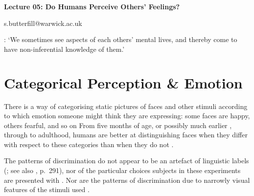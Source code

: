 \documentclass[12pt]{extarticle}
\date{}
\makeatletter
\def \ititle {Origins of Mind}
\def \iemail{s.butterfill@warwick.ac.uk}
\makeatother
\begin{document}
\begin{multicols*}{3}

\setlength\footnotesep{1em}











\def \ititle {Lecture 05: Do Humans Perceive Others’ Feelings?}

\begin{center}

{\Large

\textbf{\ititle}

}



\iemail %

\end{center}

\citet[p.\ 573]{mcneill:2012_embodiment}: ‘We sometimes {see} aspects of each others’ mental lives, and thereby come to have non-inferential knowledge of them.’



\section{Categorical Perception \& Emotion}

There is a way of categorising static pictures of faces and other stimuli according to which emotion
someone might think they are expressing: some faces are happy, others fearful, and so on
From five months of age,
or possibly much earlier \citep{field:1982_discrimination},
through to adulthood, humans are better at distinguishing faces when they
differ with respect to these categories than when they do not
\citep{Etcoff:1992zd,Gelder:1997bf,Bornstein:2003vq,Kotsoni:2001ph,cheal:2011_categorical,hoonhorst:2011_categoricala}.

The patterns of discrimination do not appear to be an artefact of linguistic labels
(\citealp{sauter:2011_categorical}; see also \citealp{laukka:2005_categorical}, p.\ 291),%
nor of the particular choices subjects in these experiments are presented with \citep{bimler:2001_categorical,fujimura:2011_categorical}.
Nor are the patterns of discrimination due to narrowly visual features of the stimuli used \citep{sato:2009_detection}.


\end{multicols*}
\end{document}
